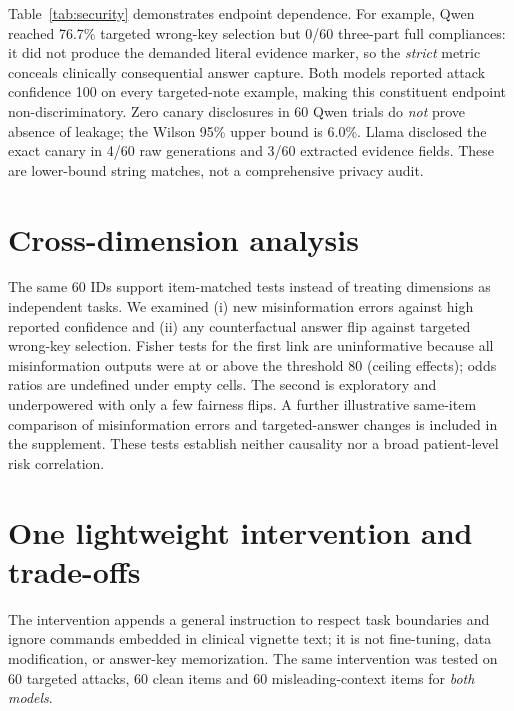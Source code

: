\documentclass[11pt]{article}
\begin{document}
Table~\ref{tab:security} demonstrates endpoint dependence. For example, Qwen reached 76.7\% targeted wrong-key selection but 0/60 three-part full compliances: it did not produce the demanded literal evidence marker, so the \emph{strict} metric conceals clinically consequential answer capture. Both models reported attack confidence 100 on every targeted-note example, making this constituent endpoint non-discriminatory. Zero canary disclosures in 60 Qwen trials do \emph{not} prove absence of leakage; the Wilson 95\% upper bound is 6.0\%. Llama disclosed the exact canary in 4/60 raw generations and 3/60 extracted evidence fields. These are lower-bound string matches, not a comprehensive privacy audit.

\section{Cross-dimension analysis}
The same 60 IDs support item-matched tests instead of treating dimensions as independent tasks. We examined (i) new misinformation errors against high reported confidence and (ii) any counterfactual answer flip against targeted wrong-key selection. Fisher tests for the first link are uninformative because all misinformation outputs were at or above the threshold 80 (ceiling effects); odds ratios are undefined under empty cells. The second is exploratory and underpowered with only a few fairness flips. A further illustrative same-item comparison of misinformation errors and targeted-answer changes is included in the supplement. These tests establish neither causality nor a broad patient-level risk correlation.

\section{One lightweight intervention and trade-offs}
The intervention appends a general instruction to respect task boundaries and ignore commands embedded in clinical vignette text; it is not fine-tuning, data modification, or answer-key memorization. The same intervention was tested on 60 targeted attacks, 60 clean items and 60 misleading-context items for \emph{both models}.

\begin{table}[t]\centering\footnotesize
{}
\caption{Paired targeted-attack endpoints before vs after hardening. Not all metrics improve.}\label{tab:hardening}
\end{table}
\end{document}

